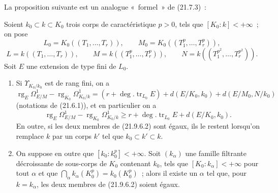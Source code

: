 La proposition suivante est un analogue «~formel~» de (21.7.3)~:

\begin{proposition}[21.9.6]
\label{0.21.9.6-fr}
Soient $k_0\subset k\subset K_0$ trois corps de caractéristique $p>0$, tels
que $[K_0:k]<+\infty$~; on pose
\[
  L_0=K_0((T_1,\ldots,T_r)),\qquad
  M_0=K_0((T_1^p,\ldots,T_r^p)),
\]
\[
  L=k((T_1,\ldots,T_r)),\qquad
  M=k((T_1^p,\ldots,T_r^p)),\qquad
  N=k((T_1^{p^2},\ldots,T_r^{p^2})).
\]
Soit $E$ une extension de type fini de $L_0$.
\begin{enumerate}
  \item[(i)] Si $\Upsilon_{K_0/k_0}$ est de rang fini, on a
  \begin{equation}
  \tag{21.9.6.1}
  \label{0.21.9.6.1-fr}
    \operatorname{rg}_E\Omega^1_{E/M}
    -\operatorname{rg}_{K_0}\Omega^1_{K_0/k}
    =(r+\deg.\operatorname{tr}_{L_0}E)
      +d(E/K_0,k_0)+d(E/M_0,N/k_0)
  \end{equation}
  (notations de (21.6.1)), et en particulier on a
  \begin{equation}
  \tag{21.9.6.2}
  \label{0.21.9.6.2-fr}
    \operatorname{rg}_E\Omega^1_{E/M}
    -\operatorname{rg}_{K_0}\Omega^1_{K_0/k}
    \geqslant r+\deg.\operatorname{tr}_{L_0}E+d(E/K_0,k_0).
  \end{equation}
  En outre, si les deux membres de (21.9.6.2) sont égaux, ils le restent
  lorsqu'on remplace $k$ par un corps $k'$ tel que $k_0\subset k'\subset k$.

  \item[(ii)] On suppose en outre que $[k_0:k_0^p]<+\infty$. Soit
  $(k_\alpha)$ une famille filtrante décroissante de sous-corps de $K_0$
  contenant $k_0$, tels que $[K_0:k_\alpha]<+\infty$ pour tout $\alpha$ et
  que
  $\bigcap_\alpha k_\alpha(K_0^p)=k_0(K_0^p)$~; alors il existe un $\alpha$
  tel que, pour $k=k_\alpha$, les deux membres de (21.9.6.2) soient égaux.
\end{enumerate}
\end{proposition}

